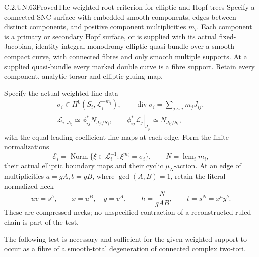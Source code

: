 \begin{statement}{C.2.UN.63}{Proved}{The weighted-root criterion for elliptic and Hopf trees}
Specify a connected SNC surface with embedded smooth components,
edges between distinct components, and positive component
multiplicities \(m_i\). Each component is a primary or secondary
Hopf surface, or is supplied with its actual fixed-Jacobian,
identity-integral-monodromy elliptic quasi-bundle over a smooth
compact curve, with connected fibres and only smooth multiple
supports. At a supplied quasi-bundle every marked double curve
is a fibre support. Retain every component, analytic torsor and
elliptic gluing map.

Specify the actual weighted line data
\[
 \begin{gathered}
 \sigma_i\in H^0(S_i,\mathcal L_i^{-m_i}),\qquad
 \operatorname{div}\sigma_i=\sum_{j\sim i}m_jJ_{ij},\\
 \mathcal L_i|_{J_{ij}}\simeq
       \phi_{ij}^{*}N_{J_{ji}/S_j},\qquad
 \phi_{ij}^{*}\mathcal L_j|_{J_{ji}}
       \simeq N_{J_{ij}/S_i},
 \end{gathered}
 \tag{C.WT.1}
\]
with the equal leading-coefficient line maps at each edge.
Form the finite normalizations
\[
 \mathcal E_i=\operatorname{Norm}
       \{\xi\in\mathcal L_i^{-1}:\xi^{m_i}=\sigma_i\},
 \qquad N=\operatorname{lcm}_i m_i,
 \tag{C.WT.2}
\]
their actual elliptic boundary maps and their cyclic
\(\mu_N\)-action. At an edge of multiplicities \(a=gA,b=gB\),
where \(\gcd(A,B)=1\), retain the literal normalized neck
\[
       uv=s^h,\qquad x=u^B,\quad y=v^A,\qquad
       h=\frac{N}{gAB},\qquad t=s^N=x^a y^b.
 \tag{C.WT.3}
\]
These are compressed necks; no unspecified contraction of a
reconstructed ruled chain is part of the test.

The following test is necessary and sufficient for the given
weighted support to occur as a fibre of a smooth-total
degeneration of connected complex two-tori.


\end{statement}
